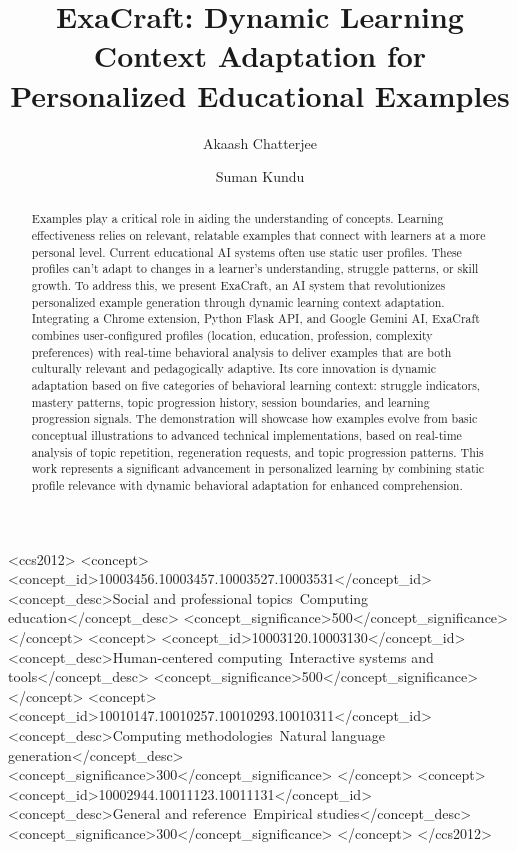 \documentclass[sigconf]{acmart}
\begin{document}
\title{ExaCraft: Dynamic Learning Context Adaptation for Personalized Educational Examples}

\author{Akaash Chatterjee}
\author{Suman Kundu}
\authornotemark[1]

\begin{abstract}
Examples play a critical role in aiding the understanding of concepts. Learning effectiveness relies on relevant, relatable examples that connect with learners at a more personal level. Current educational AI systems often use static user profiles. These profiles can't adapt to changes in a learner's understanding, struggle patterns, or skill growth. To address this, we present ExaCraft, an AI system that revolutionizes personalized example generation through dynamic learning context adaptation. Integrating a Chrome extension, Python Flask API, and Google Gemini AI, ExaCraft combines user-configured profiles (location, education, profession, complexity preferences) with real-time behavioral analysis to deliver examples that are both culturally relevant and pedagogically adaptive. Its core innovation is dynamic adaptation based on five categories of behavioral learning context: struggle indicators, mastery patterns, topic progression history, session boundaries, and learning progression signals. The demonstration will showcase how examples evolve from basic conceptual illustrations to advanced technical implementations, based on real-time analysis of topic repetition, regeneration requests, and topic progression patterns. This work represents a significant advancement in personalized learning by combining static profile relevance with dynamic behavioral adaptation for enhanced comprehension.
\end{abstract}

\begin{CCSXML}
<ccs2012>
<concept>
<concept_id>10003456.10003457.10003527.10003531</concept_id>
<concept_desc>Social and professional topics~Computing education</concept_desc>
<concept_significance>500</concept_significance>
</concept>
<concept>
<concept_id>10003120.10003130</concept_id>
<concept_desc>Human-centered computing~Interactive systems and tools</concept_desc>
<concept_significance>500</concept_significance>
</concept>
<concept>
<concept_id>10010147.10010257.10010293.10010311</concept_id>
<concept_desc>Computing methodologies~Natural language generation</concept_desc>
<concept_significance>300</concept_significance>
</concept>
<concept>
<concept_id>10002944.10011123.10011131</concept_id>
<concept_desc>General and reference~Empirical studies</concept_desc>
<concept_significance>300</concept_significance>
</concept>
</ccs2012>
\end{CCSXML}
\end{document}
